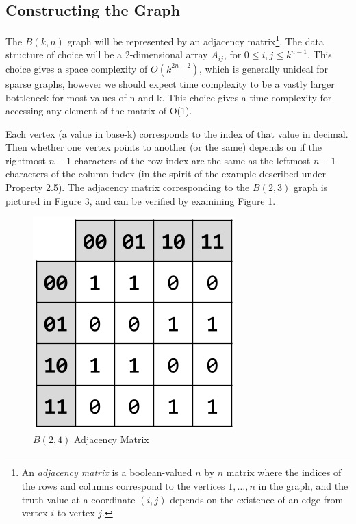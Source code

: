 \documentclass[12pt]{article}
\newcounter{example}[section]
\begin{document}
\subsection{Constructing the Graph}
The $B(k,n)$ graph will be represented by an adjacency matrix\footnote{An \emph{adjacency matrix} is a boolean-valued $n$ by $n$ matrix where the indices of the rows and columns correspond to the vertices $1, \dots, n$ in the graph, and the truth-value at a coordinate $(i, j)$ depends on the existence of an edge from vertex $i$ to vertex $j$.}. The data structure of choice will be a 2-dimensional array $A_{ij}$, for $0\leq i,j \leq k^{n-1}$. This choice gives a space complexity of $O(k^{2n-2})$, which is generally unideal for sparse graphs, however we should expect time complexity to be a vastly larger bottleneck for most values of n and k. This choice gives a time complexity for accessing any element of the matrix of O(1). \par
Each vertex (a value in base-k) corresponds to the index of that value in decimal. Then whether one vertex points to another (or the same) depends on if the rightmost $n-1$ characters of the row index are the same as the leftmost $n-1$ characters of the column index (in the spirit of the example described under Property 2.5). The adjacency matrix corresponding to the $B(2,3)$ graph is pictured in Figure 3, and can be verified by examining Figure 1.

\begin{figure}[ht!]
\centering
\includegraphics[scale=0.4]{graphics/b23_adjmatrix.png}
\caption{$B(2,4)$ Adjacency Matrix}
\label{fig:$B(2,4)$ Adjacency Matrix}
\end{figure}
\end{document}
